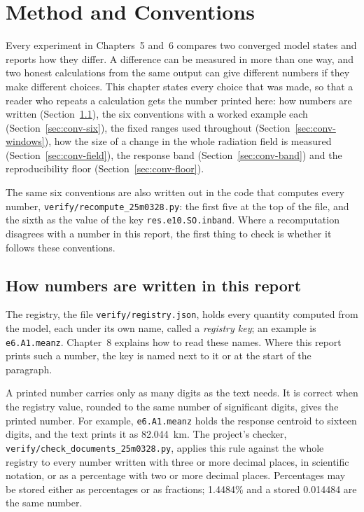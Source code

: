 
\chapter{Method and Conventions}
\label{ch:conv}

Every experiment in Chapters~5 and~6 compares two converged model states and reports
how they differ. A difference can be measured in more than one way, and two honest
calculations from the same output can give different numbers if they make different
choices. This chapter states every choice that was made, so that a reader who repeats
a calculation gets the number printed here: how numbers are written
(Section~\ref{sec:conv-numbers}), the six conventions with a worked example each
(Section~\ref{sec:conv-six}), the fixed ranges used throughout
(Section~\ref{sec:conv-windows}), how the size of a change in the whole radiation field
is measured (Section~\ref{sec:conv-field}), the response band
(Section~\ref{sec:conv-band}) and the reproducibility floor
(Section~\ref{sec:conv-floor}).

The same six conventions are also written out in the code that computes every number,
\texttt{verify/recompute\_25m0328.py}: the first five at the top of the file, and the
sixth as the value of the key \texttt{res.e10.SO.inband}. Where a recomputation disagrees with a number in
this report, the first thing to check is whether it follows these conventions.

\section{How numbers are written in this report}
\label{sec:conv-numbers}

The registry, the file \texttt{verify/registry.json}, holds every quantity computed from
the model, each under its own name, called a \emph{registry key}; an example is
\texttt{e6.A1.meanz}. Chapter~8 explains how to read these names. Where this report prints such a number, the key is
named next to it or at the start of the paragraph.

A printed number carries only as many digits as the text needs. It is correct when the
registry value, rounded to the same number of significant digits, gives the printed
number. For example, \texttt{e6.A1.meanz} holds the response centroid to sixteen digits,
and the text prints it as 82.044~km. The project's checker,
\texttt{verify/check\_documents\_25m0328.py}, applies this rule against the whole
registry to every number written with three or more decimal places, in scientific
notation, or as a percentage with two or more decimal places.
Percentages may be stored either as percentages or as fractions; 1.4484\% and a stored
0.014484 are the same number.

